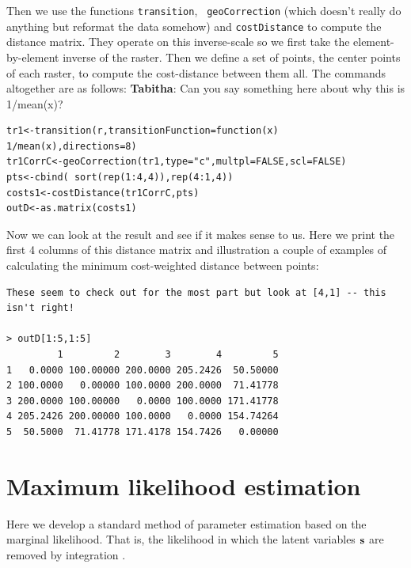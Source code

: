 \documentclass[12pt]{article}
\begin{document}
Then we use the functions \mbox{\tt transition}, \mbox{\tt
  geoCorrection} (which doesn't really do anything but reformat the
data somehow) and \mbox{\tt costDistance} to compute the distance
matrix. They operate on this inverse-scale so we first take the 
element-by-element inverse of the raster. Then we define a set of points,
the center points of each raster, to compute the cost-distance between
them all. The commands altogether are as follows:
{\bf Tabitha}: Can you say something here about why this is 1/mean(x)?
\begin{verbatim}
tr1<-transition(r,transitionFunction=function(x) 1/mean(x),directions=8)
tr1CorrC<-geoCorrection(tr1,type="c",multpl=FALSE,scl=FALSE)
pts<-cbind( sort(rep(1:4,4)),rep(4:1,4))
costs1<-costDistance(tr1CorrC,pts)
outD<-as.matrix(costs1)
\end{verbatim}
Now we can look at the result and see if it makes sense to us. Here we
print the first 4 columns of this distance matrix and illustration a
couple of examples of calculating the minimum cost-weighted distance
between points:

\begin{verbatim}
These seem to check out for the most part but look at [4,1] -- this isn't right!

> outD[1:5,1:5]
         1         2        3        4         5
1   0.0000 100.00000 200.0000 205.2426  50.50000
2 100.0000   0.00000 100.0000 200.0000  71.41778
3 200.0000 100.00000   0.0000 100.0000 171.41778
4 205.2426 200.00000 100.0000   0.0000 154.74264
5  50.5000  71.41778 171.4178 154.7426   0.00000

\end{verbatim}





\section{Maximum likelihood estimation}

Here we develop a standard method of parameter estimation based on
the marginal likelihood. That is, the likelihood in which the latent
variables ${\bf s}$ are removed by integration \citep{borchers_efford:2008}. 
\end{document}
